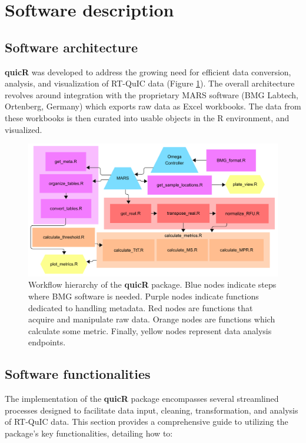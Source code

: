 \documentclass[preprint,12pt,a4paper]{elsarticle}
\begin{document}
\section{Software description}
\subsection{Software architecture}
\textbf{quicR} was developed to address the growing need for efficient data conversion, analysis, and visualization of RT-QuIC data (Figure \ref{fig:workflow}). The overall architecture revolves around integration with the proprietary MARS software (BMG Labtech, Ortenberg, Germany) which exports raw data as Excel workbooks. The data from these workbooks is then curated into usable objects in the R environment, and visualized.

\begin{figure}[ht]
\centering
\includegraphics[width=\textwidth]{images/workflow.png}
\caption{Workflow hierarchy of the \textbf{quicR} package. Blue nodes indicate steps where BMG software is needed. Purple nodes indicate functions dedicated to handling metadata. Red nodes are functions that acquire and manipulate raw data. Orange nodes are functions which calculate some metric. Finally, yellow nodes represent data analysis endpoints.}
\label{fig:workflow}
\end{figure}

\subsection{Software functionalities}
The implementation of the \textbf{quicR} package encompasses several streamlined processes designed to facilitate data input, cleaning, transformation, and analysis of RT-QuIC data. This section provides a comprehensive guide to utilizing the package's key functionalities, detailing how to:
\end{document}
